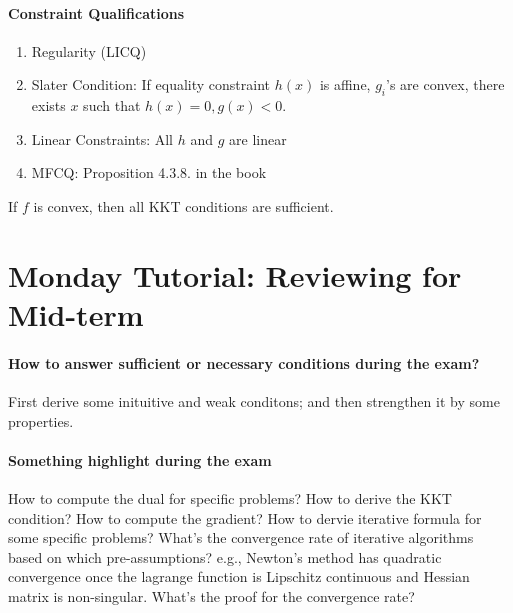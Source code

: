 \paragraph{Constraint Qualifications}
\begin{enumerate}
\item
Regularity (LICQ)
\item
Slater Condition: If equality constraint $h(x)$ is affine, $g_i$'s are convex, there exists $x$ such that $h(x)=0,g(x)<0$.
\item
Linear Constraints: All $h$ and $g$ are linear
\item
MFCQ: Proposition 4.3.8. in the book
\end{enumerate}

\begin{remark}
If $f$ is convex, then all KKT conditions are sufficient.
\end{remark}
\section{Monday Tutorial: Reviewing for Mid-term}
\paragraph{How to answer sufficient or necessary conditions during the exam? }First derive some inituitive and weak conditons; and then strengthen it by some properties.
\paragraph{Something highlight during the exam}How to compute the dual for specific problems? How to derive the KKT condition? How to compute the gradient? How to dervie iterative formula for some specific problems? What's the convergence rate of iterative algorithms based on which pre-assumptions? e.g., Newton's method has quadratic convergence once the lagrange function is Lipschitz continuous and Hessian matrix is non-singular. What's the proof for the convergence rate?
















